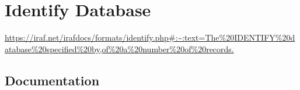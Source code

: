 
\renewcommand{\footerfilename}{IdentifyDB.tex}

\section{Identify Database}

\url{https://iraf.net/irafdocs/formats/identify.php#:~:text=The%20IDENTIFY%20database%20specified%20by,of%20a%20number%20of%20records.}

\subsection{Documentation}


\begingroup \fontsize{10pt}{10pt}
\selectfont
